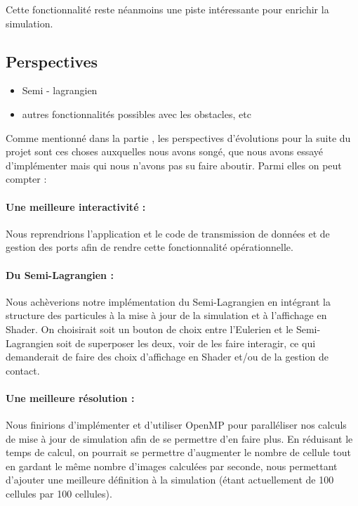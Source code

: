 \documentclass[a4paper]{article}
\begin{document}
Cette fonctionnalité reste néanmoins une piste intéressante pour enrichir la simulation.



\subsection{Perspectives}\label{sec:persp}
\begin{itemize}
  \item Semi - lagrangien
  \item autres fonctionnalités possibles avec les obstacles, etc
\end{itemize}


Comme mentionné dans la partie \underline{\emph{}}, les perspectives d'évolutions pour la suite du projet sont ces choses auxquelles nous avons songé, que nous avons essayé d'implémenter mais qui nous n'avons pas su faire aboutir. Parmi elles on peut compter :

\paragraph{Une meilleure interactivité :} Nous reprendrions l'application et le code de transmission de données et de gestion des ports afin de rendre cette fonctionnalité opérationnelle.

\paragraph{Du Semi-Lagrangien :} Nous achèverions notre implémentation du Semi-Lagrangien en intégrant la structure des particules à la mise à jour de la simulation et à l'affichage en Shader. On choisirait soit un bouton de choix entre l'Eulerien et le Semi-Lagrangien soit de superposer les deux, voir de les faire interagir, ce qui demanderait de faire des choix d'affichage en Shader et/ou de la gestion de contact.

\paragraph{Une meilleure résolution :} Nous finirions d'implémenter et d'utiliser OpenMP pour paralléliser nos calculs de mise à jour de simulation afin de se permettre d'en faire plus. En réduisant le temps de calcul, on pourrait se permettre d'augmenter le nombre de cellule tout en gardant le même nombre d'images calculées par seconde, nous permettant d'ajouter une meilleure définition à la simulation (étant actuellement de 100 cellules par 100 cellules).
\end{document}
